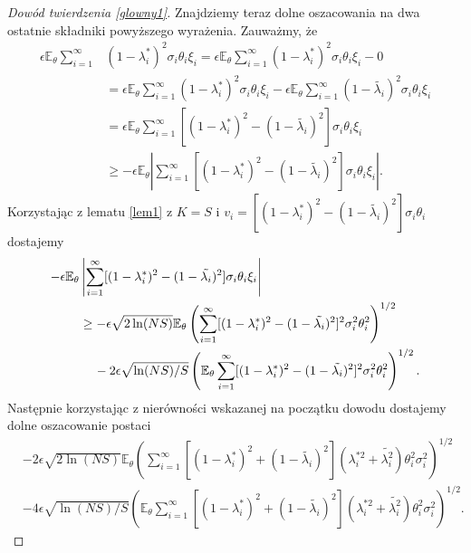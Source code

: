 \documentclass[man,mfiu]{mgrwms}
\begin{document}
\begin{proof}[Dowód twierdzenia \ref{glowny1}]
Znajdziemy teraz dolne oszacowania na dwa ostatnie składniki powyższego wyrażenia. Zauważmy, że 
\begin{displaymath}
\begin{split}
\epsilon\mathbb{E}_{\theta}\sum_{i=1}^{\infty}&(1-\lambda_i^*)^2\sigma_i\theta_i\xi_i=\epsilon\mathbb{E}_{\theta}\sum_{i=1}^{\infty}(1-\lambda_i^*)^2\sigma_i\theta_i\xi_i-0\\
&=\epsilon\mathbb{E}_{\theta}\sum_{i=1}^{\infty}(1-\lambda_i^*)^2\sigma_i\theta_i\xi_i-\epsilon\mathbb{E}_{\theta}\sum_{i=1}^{\infty}(1-\tilde{\lambda_i})^2\sigma_i\theta_i\xi_i\\
&=\epsilon\mathbb{E}_{\theta}\sum_{i=1}^{\infty}[(1-\lambda_i^*)^2-(1-\tilde{\lambda_i})^2]\sigma_i\theta_i\xi_i\\
&\geq -\epsilon\mathbb{E}_{\theta}\left|\sum_{i=1}^{\infty}[(1-\lambda_i^*)^2-(1-\tilde{\lambda_i})^2]\sigma_i\theta_i\xi_i\right|.
\end{split}
\end{displaymath}
Korzystając z lematu \ref{lem1} z $K=S$ i $v_i=[(1-\lambda_i^*)^2-(1-\tilde{\lambda_i})^2]\sigma_i\theta_i$ dostajemy
\begin{displaymath}
\begin{split}
-\epsilon\mathbb{E}_{\theta}&\left|\sum_{i=1}^{\infty}[(1-\lambda_i^*)^2-(1-\tilde{\lambda_i})^2]\sigma_i\theta_i\xi_i\right|\\
&\geq -\epsilon\sqrt{2\ln (NS)}\mathbb{E}_{\theta}\left(\sum_{i=1}^{\infty}[(1-\lambda_i^*)^2-(1-\tilde{\lambda_i})^2]^2\sigma_i^2\theta_i^2\right)^{1/2}\\
&\hspace{4mm}-2\epsilon\sqrt{\ln (NS)/S}\left(\mathbb{E}_{\theta}\sum_{i=1}^{\infty}[(1-\lambda_i^*)^2-(1-\tilde{\lambda_i})^2]^2\sigma_i^2\theta_i^2\right)^{1/2}.
\end{split}
\end{displaymath}
Następnie korzystając z nierówności wskazanej na początku dowodu dostajemy dolne oszacowanie postaci
\begin{displaymath}
\begin{split}
&-2\epsilon\sqrt{2\ln (NS)}\mathbb{E}_{\theta}\left(\sum_{i=1}^{\infty}[(1-\lambda_i^*)^2+(1-\tilde{\lambda_i})^2](\lambda_i^{*2}+\tilde{\lambda_i^2})\theta_i^2\sigma_i^2\right)^{1/2}\\
&-4\epsilon\sqrt{\ln (NS)/S}\left(\mathbb{E}_{\theta}\sum_{i=1}^{\infty}[(1-\lambda_i^*)^2+(1-\tilde{\lambda_i})^2](\lambda_i^{*2}+\tilde{\lambda_i^2})\theta_i^2\sigma_i^2\right)^{1/2}.
\end{split}

\end{displaymath}
\end{proof}
\end{document}
